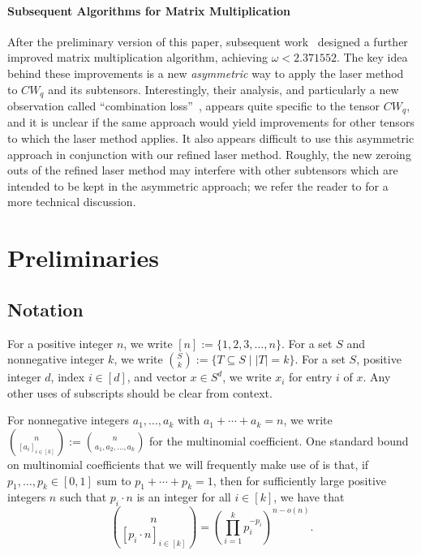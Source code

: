\PassOptionsToPackage{shortlabels}{enumitem}\documentclass[10pt,a4paper]{article}
\begin{document}
\paragraph*{Subsequent Algorithms for Matrix Multiplication}

After the preliminary version of this paper, subsequent work~\cite{duan2023faster,williams2024new} designed a further improved matrix multiplication algorithm, achieving $\omega < 2.371552$. The key idea behind these improvements is a new \emph{asymmetric} way to apply the laser method to $CW_q$ and its subtensors. Interestingly, their analysis, and particularly a new observation called ``combination loss''~\cite{duan2023faster}, appears quite specific to the tensor $CW_q$, and it is unclear if the same approach would yield improvements for other tensors to which the laser method applies. It also appears difficult to use this asymmetric approach in conjunction with our refined laser method. Roughly, the new zeroing outs of the refined laser method may interfere with other subtensors which are intended to be kept in the asymmetric approach; we refer the reader to \cite[End of Section 2.2]{williams2024new} for a more technical discussion.


\section{Preliminaries} \label{sec:prelims}

\subsection{Notation}

For a positive integer $n$, we write $[n] := \{1,2,3,\ldots,n\}$. For a set $S$ and nonnegative integer $k$, we write $\binom{S}{k} := \{ T \subseteq S \mid |T|=k\}$. For a set $S$, positive integer $d$, index $i \in [d]$, and vector $x \in S^d$, we write $x_i$ for entry $i$ of $x$. Any other uses of subscripts should be clear from context.

For nonnegative integers $a_1, \ldots, a_k$ with $a_1 + \cdots + a_k = n$, we write $\binom{n}{[a_i]_{i \in [k]}} := \binom{n}{a_1,a_2,\ldots,a_k}$ for the multinomial coefficient. One standard bound on multinomial coefficients that we will frequently make use of is that, if $p_1, \ldots, p_k \in [0,1]$ sum to $p_1 + \cdots + p_k = 1$, then for sufficiently large positive integers $n$ such that $p_i \cdot n$ is an integer for all $i \in [k]$, we have that $$\binom{n}{[p_i \cdot n]_{i \in [k]}} = \left( \prod_{i=1}^k p_i^{-p_i} \right)^{n - o(n)}.$$
\end{document}
